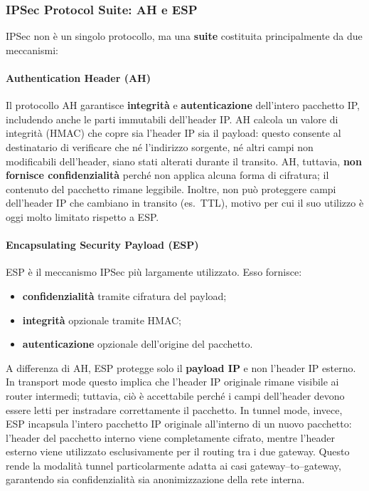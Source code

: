 \subsubsection{IPSec Protocol Suite: AH e ESP}

IPSec non è un singolo protocollo, ma una \textbf{suite} costituita principalmente da due
meccanismi:

\paragraph{Authentication Header (AH)}
Il protocollo AH garantisce \textbf{integrità} e \textbf{autenticazione} dell’intero pacchetto IP,
includendo anche le parti immutabili dell’header IP. AH calcola un valore di integrità
(HMAC) che copre sia l’header IP sia il payload: questo consente al destinatario di
verificare che né l’indirizzo sorgente, né altri campi non modificabili dell’header, siano stati
alterati durante il transito. AH, tuttavia, \textbf{non fornisce confidenzialità} perché non applica
alcuna forma di cifratura; il contenuto del pacchetto rimane leggibile. Inoltre, non può
proteggere campi dell’header IP che cambiano in transito (es.\ TTL), motivo per cui il suo
utilizzo è oggi molto limitato rispetto a ESP.

\paragraph{Encapsulating Security Payload (ESP)}
ESP è il meccanismo IPSec più largamente utilizzato. Esso fornisce:
\begin{itemize}
    \item \textbf{confidenzialità} tramite cifratura del payload;
    \item \textbf{integrità} opzionale tramite HMAC;
    \item \textbf{autenticazione} opzionale dell’origine del pacchetto.
\end{itemize}

A differenza di AH, ESP protegge solo il \textbf{payload IP} e non l’header IP esterno. In
transport mode questo implica che l’header IP originale rimane visibile ai router
intermedi; tuttavia, ciò è accettabile perché i campi dell’header devono essere letti per
instradare correttamente il pacchetto. In tunnel mode, invece, ESP incapsula l’intero
pacchetto IP originale all’interno di un nuovo pacchetto: l’header del pacchetto interno
viene completamente cifrato, mentre l’header esterno viene utilizzato esclusivamente per
il routing tra i due gateway. Questo rende la modalità tunnel particolarmente adatta ai
casi gateway–to–gateway, garantendo sia confidenzialità sia anonimizzazione della rete
interna.

